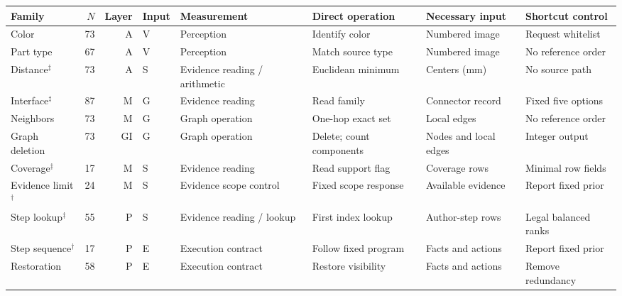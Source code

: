 \begin{tabularx}{\linewidth}{lrrlXXXX}
\toprule
Family & $N$ & Layer & Input & Measurement & Direct operation & Necessary input & Shortcut control\\\midrule
Color & 73 & A & V & Perception & Identify color & Numbered image & Request whitelist\\
Part type & 67 & A & V & Perception & Match source type & Numbered image & No reference order\\
Distance$^\ddagger$ & 73 & A & S & Evidence reading / arithmetic & Euclidean minimum & Centers (mm) & No source path\\
Interface$^\ddagger$ & 87 & M & G & Evidence reading & Read family & Connector record & Fixed five options\\
Neighbors & 73 & M & G & Graph operation & One-hop exact set & Local edges & No reference order\\
Graph deletion & 73 & GI & G & Graph operation & Delete; count components & Nodes and local edges & Integer output\\
Coverage$^\ddagger$ & 17 & M & S & Evidence reading & Read support flag & Coverage rows & Minimal row fields\\
Evidence limit$^\dagger$ & 24 & M & S & Evidence scope control & Fixed scope response & Available evidence & Report fixed prior\\
Step lookup$^\ddagger$ & 55 & P & S & Evidence reading / lookup & First index lookup & Author-step rows & Legal balanced ranks\\
Step sequence$^\dagger$ & 17 & P & E & Execution contract & Follow fixed program & Facts and actions & Report fixed prior\\
Restoration & 58 & P & E & Execution contract & Restore visibility & Facts and actions & Remove redundancy\\
\bottomrule
\end{tabularx}
